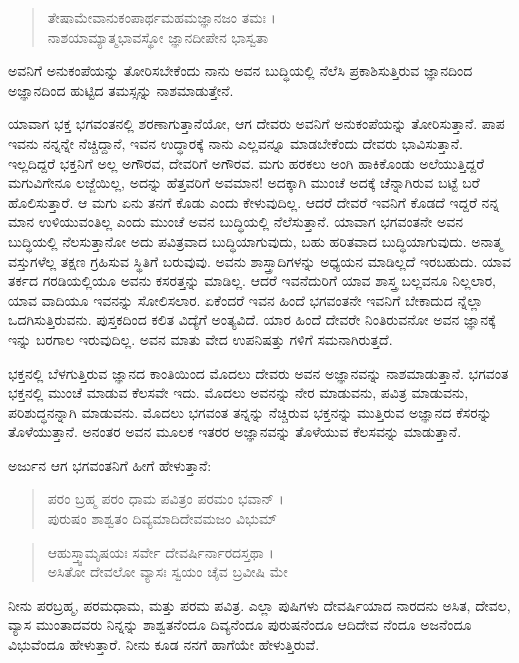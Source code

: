 \begin{verse}
ತೇಷಾಮೇವಾನುಕಂಪಾರ್ಥಮಹಮಜ್ಞಾನಜಂ ತಮಃ ।\\ನಾಶಯಾಮ್ಯಾತ್ಮಭಾವಸ್ಥೋ ಜ್ಞಾನದೀಪೇನ ಭಾಸ್ವತಾ 
\end{verse}

{\small ಅವನಿಗೆ ಅನುಕಂಪೆಯನ್ನು ತೋರಿಸಬೇಕೆಂದು ನಾನು ಅವನ ಬುದ್ಧಿಯಲ್ಲಿ ನೆಲೆಸಿ ಪ್ರಕಾಶಿಸುತ್ತಿರುವ ಜ್ಞಾನದಿಂದ ಅಜ್ಞಾನದಿಂದ ಹುಟ್ಟಿದ ತಮಸ್ಸನ್ನು ನಾಶಮಾಡುತ್ತೇನೆ.}

ಯಾವಾಗ ಭಕ್ತ ಭಗವಂತನಲ್ಲಿ ಶರಣಾಗುತ್ತಾನೆಯೋ, ಆಗ ದೇವರು ಅವನಿಗೆ ಅನುಕಂಪೆಯನ್ನು ತೋರಿಸುತ್ತಾನೆ. ಪಾಪ ಇವನು ನನ್ನನ್ನೇ ನೆಚ್ಚಿದ್ದಾನೆ, ಇವನ ಉದ್ಧಾರಕ್ಕೆ ನಾನು ಎಲ್ಲವನ್ನೂ ಮಾಡಬೇಕೆಂದು ದೇವರು ಭಾವಿಸುತ್ತಾನೆ. ಇಲ್ಲದಿದ್ದರೆ ಭಕ್ತನಿಗೆ ಅಲ್ಲ ಅಗೌರವ, ದೇವರಿಗೆ ಅಗೌರವ. ಮಗು ಹರಕಲು ಅಂಗಿ ಹಾಕಿಕೊಂಡು ಅಲೆಯುತ್ತಿದ್ದರೆ ಮಗುವಿಗೇನೂ ಲಜ್ಜೆಯಿಲ್ಲ, ಅದನ್ನು ಹೆತ್ತವರಿಗೆ ಅವಮಾನ! ಅದಕ್ಕಾಗಿ ಮುಂಚೆ ಅದಕ್ಕೆ ಚೆನ್ನಾಗಿರುವ ಬಟ್ಟೆ ಬರೆ ಹೊಲಿಸುತ್ತಾರೆ. ಆ ಮಗು ಏನು ತನಗೆ ಕೊಡು ಎಂದು ಕೇಳುವುದಿಲ್ಲ. ಆದರೆ ದೇವರೆ ಇವನಿಗೆ ಕೊಡದೆ ಇದ್ದರೆ ನನ್ನ ಮಾನ ಉಳಿಯುವಂತಿಲ್ಲ ಎಂದು ಮುಂಚೆ ಅವನ ಬುದ್ಧಿಯಲ್ಲಿ ನೆಲೆಸುತ್ತಾನೆ. ಯಾವಾಗ ಭಗವಂತನೇ ಅವನ ಬುದ್ಧಿಯಲ್ಲಿ ನೆಲಸುತ್ತಾನೋ ಅದು ಪವಿತ್ರವಾದ ಬುದ್ಧಿಯಾಗುವುದು, ಬಹು ಹರಿತವಾದ ಬುದ್ಧಿಯಾಗುವುದು. ಅನಾತ್ಮ ವಸ್ತುಗಳೆಲ್ಲ ತಕ್ಷಣ ಗ್ರಹಿಸುವ ಸ್ಥಿತಿಗೆ ಬರುವುವು. ಅವನು ಶಾಸ್ತ್ರಾದಿಗಳನ್ನು ಅಧ್ಯಯನ ಮಾಡಿಲ್ಲದೆ ಇರಬಹುದು. ಯಾವ ತರ್ಕದ ಗರಡಿಯಲ್ಲಿಯೂ ಅವನು ಕಸರತ್ತನ್ನು ಮಾಡಿಲ್ಲ. ಆದರೆ ಇವನೆದುರಿಗೆ ಯಾವ ಶಾಸ್ತ್ರ ಬಲ್ಲವನೂ ನಿಲ್ಲಲಾರ, ಯಾವ ವಾದಿಯೂ ಇವನನ್ನು ಸೋಲಿಸಲಾರ. ಏಕೆಂದರೆ ಇವನ ಹಿಂದೆ ಭಗವಂತನೇ ಇವನಿಗೆ ಬೇಕಾದುದ ನ್ನೆಲ್ಲಾ ಒದಗಿಸುತ್ತಿರುವನು. ಪುಸ್ತಕದಿಂದ ಕಲಿತ ವಿದ್ಯೆಗೆ ಅಂತ್ಯವಿದೆ. ಯಾರ ಹಿಂದೆ ದೇವರೇ ನಿಂತಿರುವನೋ ಅವನ ಜ್ಞಾನಕ್ಕೆ ಇನ್ನು ಬರಗಾಲ ಇರುವುದಿಲ್ಲ. ಅವನ ಮಾತು ವೇದ ಉಪನಿಷತ್ತು ಗಳಿಗೆ ಸಮನಾಗಿರುತ್ತದೆ.

ಭಕ್ತನಲ್ಲಿ ಬೆಳಗುತ್ತಿರುವ ಜ್ಞಾನದ ಕಾಂತಿಯಿಂದ ಮೊದಲು ದೇವರು ಅವನ ಅಜ್ಞಾನವನ್ನು ನಾಶಮಾಡುತ್ತಾನೆ. ಭಗವಂತ ಭಕ್ತನಲ್ಲಿ ಮುಂಚೆ ಮಾಡುವ ಕೆಲಸವೇ ಇದು. ಮೊದಲು ಅವನನ್ನು ನೇರ ಮಾಡುವನು, ಪವಿತ್ರ ಮಾಡುವನು, ಪರಿಶುದ್ಧನನ್ನಾಗಿ ಮಾಡುವನು. ಮೊದಲು ಭಗವಂತ ತನ್ನನ್ನು ನೆಚ್ಚಿರುವ ಭಕ್ತನನ್ನು ಮುತ್ತಿರುವ ಅಜ್ಞಾನದ ಕೆಸರನ್ನು ತೊಳೆಯುತ್ತಾನೆ. ಅನಂತರ ಅವನ ಮೂಲಕ ಇತರರ ಅಜ್ಞಾನವನ್ನು ತೊಳೆಯುವ ಕೆಲಸವನ್ನು ಮಾಡುತ್ತಾನೆ.

ಅರ್ಜುನ ಆಗ ಭಗವಂತನಿಗೆ ಹೀಗೆ ಹೇಳುತ್ತಾನೆ:

\begin{verse}
ಪರಂ ಬ್ರಹ್ಮ ಪರಂ ಧಾಮ ಪವಿತ್ರಂ ಪರಮಂ ಭವಾನ್ ।\\ಪುರುಷಂ ಶಾಶ್ವತಂ ದಿವ್ಯಮಾದಿದೇವಮಜಂ ವಿಭುಮ್ 
\end{verse}

\begin{verse}
ಆಹುಸ್ತ್ವಾಮೃಷಯಃ ಸರ್ವೇ ದೇವರ್ಷಿರ್ನಾರದಸ್ತಥಾ ।\\ಅಸಿತೋ ದೇವಲೋ ವ್ಯಾಸಃ ಸ್ವಯಂ ಚೈವ ಬ್ರವೀಷಿ ಮೇ 
\end{verse}

{\small ನೀನು ಪರಬ್ರಹ್ಮ, ಪರಮಧಾಮ, ಮತ್ತು ಪರಮ ಪವಿತ್ರ. ಎಲ್ಲಾ ಪುಷಿಗಳು ದೇವರ್ಷಿಯಾದ ನಾರದನು ಅಸಿತ, ದೇವಲ, ವ್ಯಾಸ ಮುಂತಾದವರು ನಿನ್ನನ್ನು ಶಾಶ್ವತನೆಂದೂ ದಿವ್ಯನೆಂದೂ ಪುರುಷನೆಂದೂ ಆದಿದೇವ ನೆಂದೂ ಅಜನೆಂದೂ ವಿಭುವೆಂದೂ ಹೇಳುತ್ತಾರೆ. ನೀನು ಕೂಡ ನನಗೆ ಹಾಗೆಯೇ ಹೇಳುತ್ತಿರುವೆ. }

